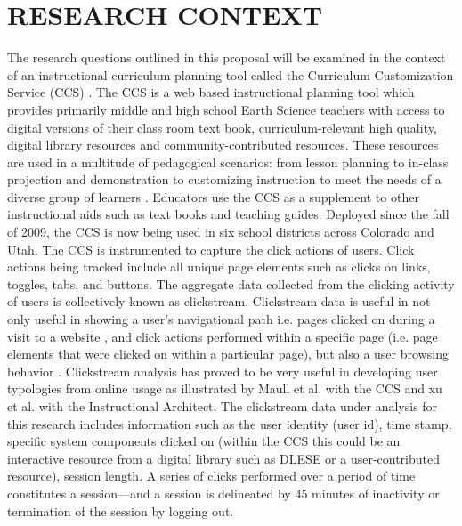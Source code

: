 \documentclass{acm_proc_article-sp}
\begin{document}
\section{RESEARCH CONTEXT}
The research questions outlined in this proposal will be examined in the context of an instructional curriculum planning tool called the Curriculum Customization Service (CCS) \cite{sumner:team}. The CCS is a web based instructional planning tool which provides primarily middle and high school Earth Science teachers with access to digital versions of their class room text book, curriculum-relevant high quality, digital library resources and community-contributed resources. These resources are used in a multitude of pedagogical scenarios: from lesson planning to in-class projection and demonstration to customizing instruction to meet the needs of a diverse group of learners \cite{Saldivar:2012}. Educators use the CCS as a supplement to other instructional aids such as text books and teaching guides. Deployed since the fall of 2009, the CCS is now being used in six school districts across Colorado and Utah. The CCS is instrumented to capture the click actions of users. Click actions being tracked include all unique page elements such as clicks on links, toggles, tabs, and buttons. The aggregate data collected from the clicking activity of users is collectively known as clickstream. Clickstream data is useful in not only useful in showing a user's navigational path i.e. pages clicked on during a visit to a website , and click actions performed within a specific page (i.e. page elements that were clicked on within a particular page), but also a user browsing behavior \cite{montgomery2004modeling}. Clickstream analysis has proved to be very useful in developing user typologies from online usage as illustrated by Maull et al. \cite{maullunderstanding} with the CCS and xu et al.\cite{xu} with the Instructional Architect. The clickstream data under analysis for this research includes information such as the user identity (user id), time stamp, specific system components clicked on (within the CCS this could be an interactive resource from a digital library such as DLESE or a user-contributed resource), session length. A series of clicks performed over a period of time constitutes a session—and a session is delineated by 45 minutes of inactivity or termination of the session by logging out.
\end{document}
